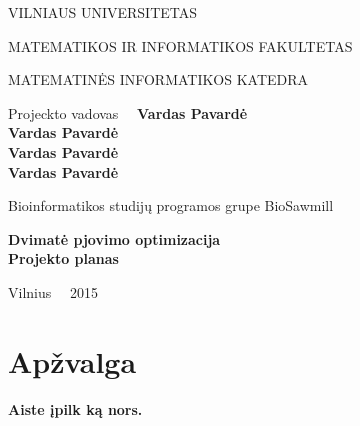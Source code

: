 \documentclass[a4paper,12pt]{article}
\begin{document}
\thispagestyle{empty} %
\begin{center}
 VILNIAUS UNIVERSITETAS 
 
MATEMATIKOS IR INFORMATIKOS FAKULTETAS

MATEMATINĖS INFORMATIKOS KATEDRA

\vspace{4cm}

Projeckto vadovas \ \ \textbf{Vardas Pavardė} \\
\textbf{Vardas Pavardė} \\
\textbf{Vardas Pavardė} \\
\textbf{Vardas Pavardė} \\

\vspace{0.2cm}

Bioinformatikos studijų programos grupe BioSawmill



\vspace{3cm}
\textbf{\Large Dvimatė pjovimo optimizacija}\\
\textbf{\Large Projekto planas}

\vfill

Vilnius \ \  2015
\end{center}

\clearpage

\tableofcontents
\clearpage

\section*{Apžvalga}
\textbf{Aiste įpilk ką nors.}
\end{document}
